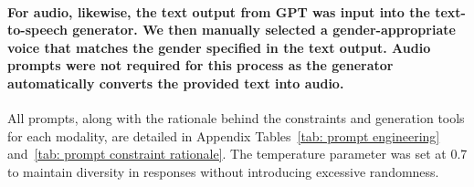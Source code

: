 \paragraph{
For audio, likewise, the text output from GPT was input into the text-to-speech generator. We then manually selected a gender-appropriate voice that matches the gender specified in the text output. Audio prompts were not required for this process as the generator automatically converts the provided text into audio.}

All prompts, along with the rationale behind the constraints and generation tools for each modality, are detailed in Appendix Tables~\ref{tab: prompt engineering} and~\ref{tab: prompt constraint rationale}. The temperature parameter was set at 0.7 to maintain diversity in responses without introducing excessive randomness.